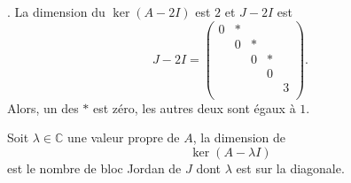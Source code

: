 \begin{example}. 
  \label{exe:53}
  La dimension du $\ker(A - 2 I)$ est $2$ et $J - 2I$ est
  \begin{displaymath}
     J  - 2I =
  \begin{pmatrix}
    0 & *  \\
    & 0 & * \\
    & & 0 & * \\
    & & & 0   \\
    & & & & 3 \\
  \end{pmatrix}. 
\end{displaymath}
Alors, un des $*$ est zéro, les autres deux sont égaux à $1$. 
\end{example}

\begin{lemma}
  \label{lem:29}
  Soit $λ ∈ℂ$ une valeur propre de $A$, la dimension de
  \begin{displaymath}
    \ker( A - λI) 
  \end{displaymath}
  est le nombre de bloc Jordan de $J$ dont  $λ$ est sur  la diagonale.  
\end{lemma}


